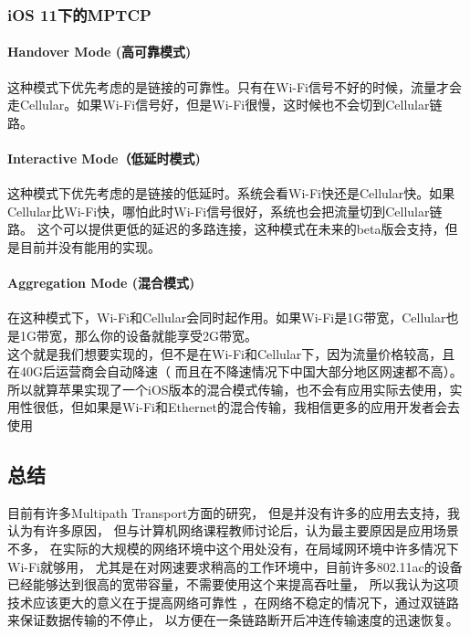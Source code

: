 \documentclass[11pt]{article}
\begin{document}
\subsubsection{iOS 11下的MPTCP}
\paragraph{Handover Mode (高可靠模式)}
这种模式下优先考虑的是链接的可靠性。只有在Wi-Fi信号不好的时候，流量才会走Cellular。如果Wi-Fi信号好，但是Wi-Fi很慢，这时候也不会切到Cellular链路。
\paragraph{Interactive Mode（低延时模式)}
这种模式下优先考虑的是链接的低延时。系统会看Wi-Fi快还是Cellular快。如果Cellular比Wi-Fi快，哪怕此时Wi-Fi信号很好，系统也会把流量切到Cellular链路。
这个可以提供更低的延迟的多路连接，这种模式在未来的beta版会支持，但是目前并没有能用的实现。
\paragraph{Aggregation Mode (混合模式)}
在这种模式下，Wi-Fi和Cellular会同时起作用。如果Wi-Fi是1G带宽，Cellular也是1G带宽，那么你的设备就能享受2G带宽。
\\[2pt]
这个就是我们想要实现的，但不是在Wi-Fi和Cellular下，因为流量价格较高，且在40G后运营商会自动降速（
而且在不降速情况下中国大部分地区网速都不高）。所以就算苹果实现了一个iOS版本的混合模式传输，也不会有应用实际去使用，实用性很低，但如果是Wi-Fi和Ethernet的混合传输，我相信更多的应用开发者会去使用
\subsection{总结}
目前有许多Multipath Transport方面的研究，
但是并没有许多的应用去支持，我认为有许多原因，
但与计算机网络课程教师讨论后，认为最主要原因是应用场景不多，
在实际的大规模的网络环境中这个用处没有，在局域网环境中许多情况下Wi-Fi就够用，
尤其是在对网速要求稍高的工作环境中，目前许多802.11ac的设备已经能够达到很高的宽带容量，不需要使用这个来提高吞吐量，
所以我认为这项技术应该更大的意义在于提高网络可靠性 ，在网络不稳定的情况下，通过双链路来保证数据传输的不停止，
以方便在一条链路断开后冲连传输速度的迅速恢复。
\nocite{*}


\end{document}
